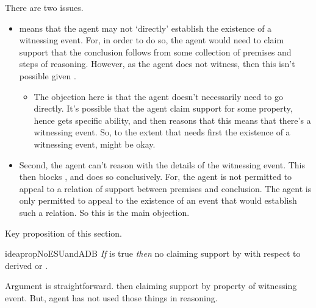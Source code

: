 \begin{note}
  \color{red}
  There are two issues.
  \begin{itemize}
  \item \ESU{} means that the agent may not `directly' establish the existence of a witnessing event.
    For, in order to do so, the agent would need to claim support that the conclusion follows from some collection of premises and steps of reasoning.
    However, as the agent does not witness, then this isn't possible given \ESU{}.
    \begin{itemize}
    \item The objection here is that the agent doesn't necessarily need to go directly.
      It's possible that the agent claim support for some property, hence gets specific ability, and then reasons that this means that there's a witnessing event.
      So, to the extent that \WR{} needs first the existence of a witnessing event, \ESU{} might be okay.
    \end{itemize}
  \item Second, the agent can't reason with the details of the witnessing event.
    This then blocks \WR{}, and does so conclusively.
    For, the agent is not permitted to appeal to a relation of support between premises and conclusion.
    The agent is only permitted to appeal to the existence of an event that would establish such a relation.
    So this is the main objection.
  \end{itemize}
\end{note}

Key proposition of this section.

\begin{note}[Proposition]
    \begin{restatable}{idea}{propNoESUandADB}\label{mcA:WR-and-denied-claim}
    \emph{If} \ESU{} is true \emph{then} no claiming support by \adB{} with respect to derived \AR{} or \WR{}.
  \end{restatable}
\end{note}

\begin{note}
  Argument is straightforward.
  \adB{} then claiming support by property of witnessing event.
  But, agent has not used those things in reasoning.
\end{note}

